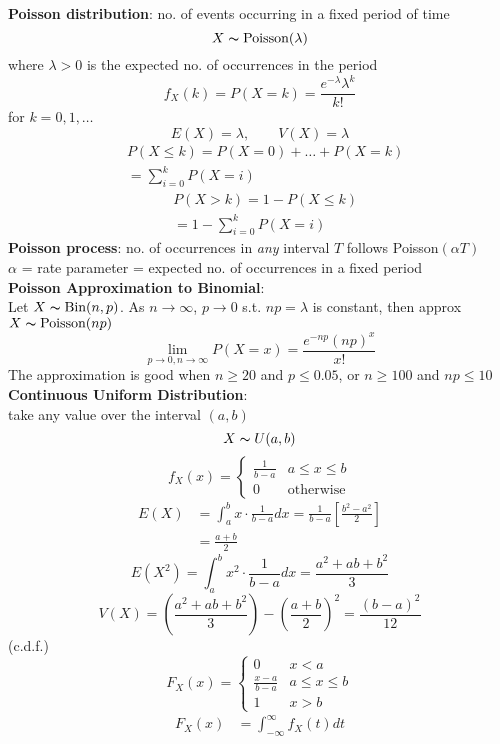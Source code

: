 \documentclass{article}
\begin{document}
\begin{multicols*}{3}
\textbf{Poisson distribution}: no. of events occurring in a fixed period of time\\
$$X\thicksim \text{Poisson}(\lambda) $$ where $\lambda>0$ is the expected no. of occurrences in the period \\
$$f_X(k)=P(X=k)=\frac{e^{-\lambda}\lambda^k}{k!}$$ for $k=0,1,\dots$ 
$$E(X)=\lambda, \qquad V(X)=\lambda$$
\begin{align*}
&P(X\leq k)=P(X=0)+\dots+P(X=k)\\
&=\sum_{i=0}^kP(X=i)    
\end{align*}
\begin{align*}
&P(X>k)=1-P(X\leq k)\\
&=1-\sum_{i=0}^kP(X=i)
\end{align*}
\textbf{Poisson process}: no. of occurrences in \textit{any} interval $T$ follows Poisson$(\alpha T)$ \\
$\alpha$ = rate parameter = expected no. of occurrences in a fixed period\\
\textbf{Poisson Approximation to Binomial}: \\
Let $X\thicksim \text{Bin}(n,p)$. As $n\to\infty$, $p\to 0$ s.t. $np=\lambda$ is constant, then approx $X\thicksim \text{Poisson}(np)$\\
$$\lim_{p\to0,n\to\infty}P(X=x)=\frac{e^{-np}(np)^x}{x!}$$
The approximation is good when $n\geq 20$ and $p\leq 0.05$, or $n\geq 100$ and $np\leq 10$\\
\textbf{Continuous Uniform Distribution}: \\
take any value over the interval $(a,b)$
$$X\thicksim U(a,b)$$
$$f_X(x)=\begin{cases}
    \frac{1}{b-a} & a\leq x\leq b \\ 0 & \text{otherwise}
\end{cases}$$
\begin{align*}
E(X)&=\int_a^bx\cdot\frac{1}{b-a}dx=\frac{1}{b-a}[\frac{b^2-a^2}{2}]\\
&=\frac{a+b}{2}
\end{align*}
$$E(X^2)=\int_a^bx^2\cdot\frac{1}{b-a}dx=\frac{a^2+ab+b^2}{3}$$
$$V(X)=(\frac{a^2+ab+b^2}{3})-(\frac{a+b}{2})^2=\frac{(b-a)^2}{12}$$
(c.d.f.) $$F_X(x)=\begin{cases}
    0 & x<a \\ \frac{x-a}{b-a} & a\leq x \leq b \\ 1 & x > b
\end{cases}$$
\begin{align*}
F_X(x)&=\int^\infty_{-\infty}f_X(t)dt\\

\end{align*}
\end{multicols*}
\end{document}
